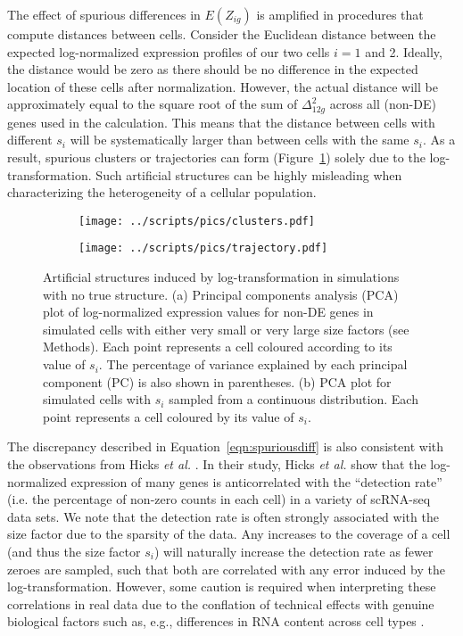 \documentclass[10pt,letterpaper]{article}
\begin{document}
The effect of spurious differences in $E(Z_{ig})$ is amplified in procedures that compute distances between cells.
Consider the Euclidean distance between the expected log-normalized expression profiles of our two cells $i=1$ and 2.
Ideally, the distance would be zero as there should be no difference in the expected location of these cells after normalization.
However, the actual distance will be approximately equal to the square root of the sum of $\Delta_{12g}^2$ across all (non-DE) genes used in the calculation.
This means that the distance between cells with different $s_i$ will be systematically larger than between cells with the same $s_i$.
As a result, spurious clusters or trajectories can form (Figure~\ref{fig:structures}) solely due to the log-transformation.
Such artificial structures can be highly misleading when characterizing the heterogeneity of a cellular population.

\begin{figure}[btp]
\centering
\begin{subfigure}[b]{0.49\textwidth}
    \texttt{[image: ../scripts/pics/clusters.pdf]}
    \caption{}
\end{subfigure}
\begin{subfigure}[b]{0.49\textwidth}
    \texttt{[image: ../scripts/pics/trajectory.pdf]}
    \caption{}
\end{subfigure}
\caption{Artificial structures induced by log-transformation in simulations with no true structure.
(a) Principal components analysis (PCA) plot of log-normalized expression values for non-DE genes in simulated cells with either very small or very large size factors (see Methods).
Each point represents a cell coloured according to its value of $s_i$.
The percentage of variance explained by each principal component (PC) is also shown in parentheses. 
(b) PCA plot for simulated cells with $s_i$ sampled from a continuous distribution.
Each point represents a cell coloured by its value of $s_i$.
}
\label{fig:structures}
\end{figure}

The discrepancy described in Equation~\ref{eqn:spuriousdiff} is also consistent with the observations from Hicks \emph{et al.} \cite{hicks2017missing}.
In their study, Hicks \emph{et al.} show that the log-normalized expression of many genes is anticorrelated with the ``detection rate'' (i.e. the percentage of non-zero counts in each cell) in a variety of scRNA-seq data sets.
We note that the detection rate is often strongly associated with the size factor due to the sparsity of the data.
Any increases to the coverage of a cell (and thus the size factor $s_i$) will naturally increase the detection rate as fewer zeroes are sampled,
such that both are correlated with any error induced by the log-transformation.
However, some caution is required when interpreting these correlations in real data due to the conflation of technical effects with genuine biological factors such as, e.g., differences in RNA content across cell types \cite{islam2011characterization,lun2017assessing}.
\end{document}
